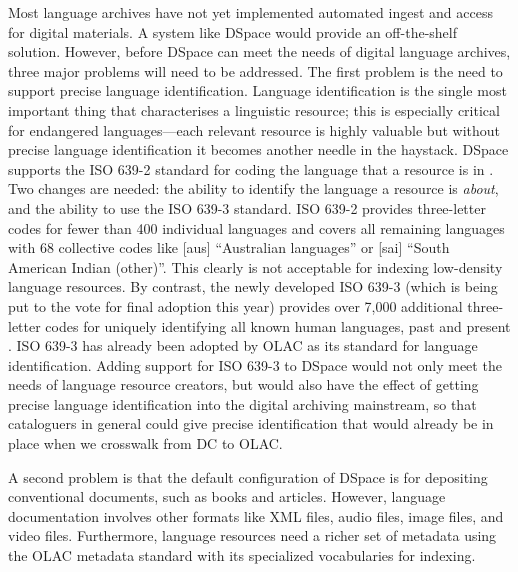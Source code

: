 Most language archives have not yet implemented automated ingest and
access for digital materials.  A system like DSpace would provide 
an off-the-shelf solution.  
However, before DSpace can meet the needs of digital language archives,
three major problems will need to be addressed.
The first problem is the need to support precise language identification.
Language identification is the single most important thing that
characterises a linguistic resource; this is especially critical for
endangered languages---each relevant resource is highly valuable but
without precise language identification it becomes another needle in
the haystack. DSpace supports the ISO 639-2 standard for coding the
language that a resource is in \citep{ISO639-2}. Two changes are needed:
the ability to identify the language a resource is \emph{about}, and
the ability to use the ISO 639-3 standard.  ISO 639-2 provides
three-letter codes for fewer than 400 individual languages and covers all
remaining languages with 68 collective codes like [aus] ``Australian 
languages'' or [sai] ``South American Indian (other)''.  This clearly
is not acceptable for indexing low-density language resources.
By contrast, the newly developed ISO 639-3 (which is being put to
the vote for final adoption this year) provides over 7,000 additional
three-letter codes for uniquely identifying all known human languages,
past and present \citep{ISO639-3}.  ISO 639-3 has already been adopted by OLAC as its
standard for language identification.
Adding support for ISO 639-3 to DSpace would not only meet the
needs of language resource creators, but would also have the
effect of getting precise language identification into the 
digital archiving mainstream, so that cataloguers in general could
give precise identification that would already be in place
when we crosswalk from DC to OLAC.


A second problem is that the default configuration of DSpace
is for depositing conventional documents, such as books and articles.
However, language documentation involves other formats like
XML files, audio files, image files, and video files. Furthermore,
language resources need a richer set of metadata using the OLAC 
metadata standard with its specialized vocabularies for indexing.

